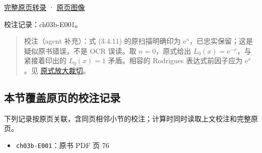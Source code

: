 \documentclass[
  10pt,
  fontset=fandol]{ctexart}
\providecommand{\tightlist}{%
  \setlength{\itemsep}{0pt}\setlength{\parskip}{0pt}}
\begin{document}
\href{../pages/pdf-076.md}{完整原页转录} · \href{../../source-images/pdf-076.jpeg}{原页图像}

校注记录：ch03b-E001。

\begin{quote}
校注（agent 补充）：式 (3.4.11) 的原扫描明确印为 \(\mathrm e^n\)，已忠实保留；这是疑似原书错误，不是 OCR 误读。取 \(n=0\)，原式给出 \(L_0(x)=\mathrm e^{-x}\)，与紧接着印出的 \(L_0(x)=1\) 矛盾。相容的 Rodrigues 表达式前因子应为 \(\mathrm e^x\)。见 \href{../assets/ch03b/p076-laguerre-formula.png}{原式放大裁切}。
\end{quote}

\subsection{本节覆盖原页的校注记录}\label{ux672cux8282ux8986ux76d6ux539fux9875ux7684ux6821ux6ce8ux8bb0ux5f55}

下列记录按原页关联，含同页相邻小节的校注；计算时同时读取上文校注和完整原页。

\begin{itemize}
\tightlist
\item
  \texttt{ch03b-E001}：原书 PDF 页 76
\end{itemize}
\end{document}
